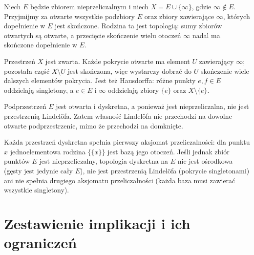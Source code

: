 \begin{przyklad}
\label{ex:topog-lindelof-nie-dziedziczna}
Niech $E$ będzie zbiorem nieprzeliczalnym i niech
$X=E\cup\{\infty\}$, gdzie $\infty\notin E$.
Przyjmijmy za otwarte wszystkie podzbiory $E$ oraz
zbiory zawierające $\infty$, których dopełnienie w $E$
jest skończone. Rodzina ta jest topologią:
sumy zbiorów otwartych są otwarte, a przecięcie
skończenie wielu otoczeń $\infty$ nadal ma skończone
dopełnienie w $E$.

Przestrzeń $X$ jest zwarta. Każde pokrycie otwarte ma
element $U$ zawierający $\infty$; pozostała część
$X\setminus U$ jest skończona, więc wystarczy dobrać
do $U$ skończenie wiele dalszych elementów pokrycia.
Jest też Hausdorffa: różne punkty $e,f\in E$
oddzielają singletony, a $e\in E$ i $\infty$
oddzielają zbiory $\{e\}$ oraz $X\setminus\{e\}$.

Podprzestrzeń $E$ jest otwarta i dyskretna, a ponieważ
jest nieprzeliczalna, nie jest przestrzenią Lindelöfa.
Zatem własność Lindelöfa nie przechodzi na dowolne
otwarte podprzestrzenie, mimo że przechodzi na domknięte.
\end{przyklad}

\begin{samepage}
\begin{przyklad}
\label{ex:topog-dyskretna-nie-osrodkowa}
Każda przestrzeń dyskretna spełnia pierwszy aksjomat
przeliczalności:
dla punktu $x$ jednoelementowa rodzina $\{\{x\}\}$
jest bazą jego otoczeń. Jeśli jednak zbiór punktów $E$
jest nieprzeliczalny, topologia dyskretna na $E$ nie jest
ośrodkowa (gęsty jest jedynie cały $E$), nie jest
przestrzenią Lindelöfa (pokrycie singletonami) ani
nie spełnia drugiego aksjomatu przeliczalności
(każda baza musi zawierać
wszystkie singletony).
\end{przyklad}
\end{samepage}

\section{Zestawienie implikacji i ich ograniczeń}
\label{sec:topog-przeliczalnosc-podsumowanie}

